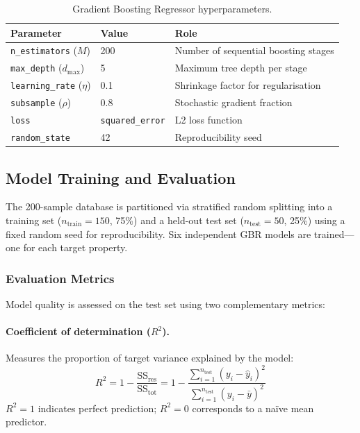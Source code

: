 \documentclass[11pt,a4paper]{article}
\begin{document}
\begin{table}[htbp]
\centering
\caption{Gradient Boosting Regressor hyperparameters.}
\label{tab:gbr_hyperparams}
\begin{tabular}{@{}lll@{}}
\toprule
\textbf{Parameter} & \textbf{Value} & \textbf{Role} \\
\midrule
\texttt{n\_estimators} ($M$) & 200 & Number of sequential boosting stages \\
\texttt{max\_depth} ($d_{\max}$) & 5 & Maximum tree depth per stage \\
\texttt{learning\_rate} ($\eta$) & 0.1 & Shrinkage factor for regularisation \\
\texttt{subsample} ($\rho$) & 0.8 & Stochastic gradient fraction \\
\texttt{loss} & \texttt{squared\_error} & L2 loss function \\
\texttt{random\_state} & 42 & Reproducibility seed \\
\bottomrule
\end{tabular}
\end{table}

\subsection{Model Training and Evaluation}
\label{sec:evaluation}

The 200-sample database is partitioned via stratified random splitting into a training set ($n_{\text{train}} = 150$, 75\%) and a held-out test set ($n_{\text{test}} = 50$, 25\%) using a fixed random seed for reproducibility. Six independent GBR models are trained---one for each target property.

\subsubsection{Evaluation Metrics}

Model quality is assessed on the test set using two complementary metrics:

\paragraph{Coefficient of determination ($R^2$).}
Measures the proportion of target variance explained by the model:
\begin{equation}
    R^2 = 1 - \frac{\text{SS}_{\text{res}}}{\text{SS}_{\text{tot}}} = 1 - \frac{\sum_{i=1}^{n_{\text{test}}}(y_i - \hat{y}_i)^2}{\sum_{i=1}^{n_{\text{test}}}(y_i - \bar{y})^2}
\end{equation}
$R^2 = 1$ indicates perfect prediction; $R^2 = 0$ corresponds to a na\"ive mean predictor.
\end{document}
